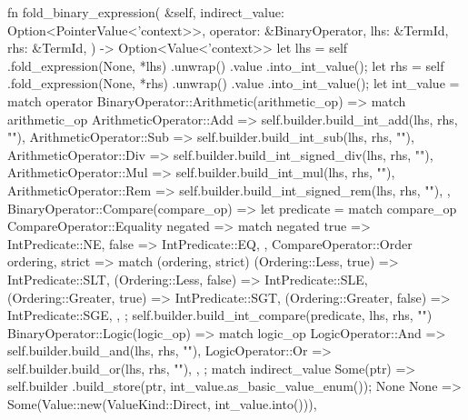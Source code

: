 \documentclass[
  oneside,
  english,
  coorientadorbanca,
  noabntexcite
]{ufsc-thesis-rn46-2019}
\begin{document}
\begin{rustcode}
{    fn fold_binary_expression(
        &self,
        indirect_value: Option<PointerValue<'context>>,
        operator: &BinaryOperator,
        lhs: &TermId,
        rhs: &TermId,
    ) -> Option<Value<'context>> {
        let lhs = self
            .fold_expression(None, *lhs)
            .unwrap()
            .value
            .into_int_value();
        let rhs = self
            .fold_expression(None, *rhs)
            .unwrap()
            .value
            .into_int_value();
        let int_value = match operator {
            BinaryOperator::Arithmetic(arithmetic_op) => match arithmetic_op {
                ArithmeticOperator::Add => self.builder.build_int_add(lhs, rhs, ""),
                ArithmeticOperator::Sub => self.builder.build_int_sub(lhs, rhs, ""),
                ArithmeticOperator::Div => self.builder.build_int_signed_div(lhs, rhs, ""),
                ArithmeticOperator::Mul => self.builder.build_int_mul(lhs, rhs, ""),
                ArithmeticOperator::Rem => self.builder.build_int_signed_rem(lhs, rhs, ""),
            },
            BinaryOperator::Compare(compare_op) => {
                let predicate = match compare_op {
                    CompareOperator::Equality { negated } => match negated {
                        true => IntPredicate::NE,
                        false => IntPredicate::EQ,
                    },
                    CompareOperator::Order { ordering, strict } => match (ordering, strict) {
                        (Ordering::Less, true) => IntPredicate::SLT,
                        (Ordering::Less, false) => IntPredicate::SLE,
                        (Ordering::Greater, true) => IntPredicate::SGT,
                        (Ordering::Greater, false) => IntPredicate::SGE,
                    },
                };
                self.builder.build_int_compare(predicate, lhs, rhs, "")
            }
            BinaryOperator::Logic(logic_op) => match logic_op {
                LogicOperator::And => self.builder.build_and(lhs, rhs, ""),
                LogicOperator::Or => self.builder.build_or(lhs, rhs, ""),
            },
        };
        match indirect_value {
            Some(ptr) => {
                self.builder
                    .build_store(ptr, int_value.as_basic_value_enum());
                None
            }
            None => Some(Value::new(ValueKind::Direct, int_value.into())),
        }
    }

}
\end{rustcode}
\end{document}
